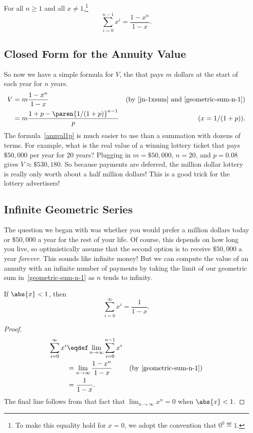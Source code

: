 \begin{theorem}
\label{th:seq}
For all $n \geq 1$ and all $x \neq 1$,\footnote{To make this equality
  hold for $x=0$, we adopt the convention that $0^0 \eqdef 1$.}
\[
\sum_{i=0}^{n-1} x^i = \frac{1- x^n}{1 - x}.
\]
\end{theorem}

\fi
\subsection{Closed Form for the Annuity Value}
So now we have a simple formula for $V$, the  that pays $m$ dollars at the start of each year for $n$ years.
\begin{align}
  V & = m \frac{1 - x^n}{1-x}
      & \text{(by~\eqref{jn-1xsum} and~\eqref{geometric-sum-n-1})}\label{Vmfrac1x}\\
  & = m \frac{1 + p - \paren{1/(1+p)}^{n-1}}{p}
      & (x = 1/(1+p)).\label{annval1p}
\end{align}
The formula~\eqref{annval1p} is much easier to use than a summation with
dozens of terms.  For example, what is the real value of a winning lottery
ticket that pays $\$50,000$ per year for 20 years?  Plugging in $m =
\$50,000$, $n = 20$, and $p = 0.08$ gives $V \approx \$530,180$.  So
because payments are deferred, the million dollar lottery is really only
worth about a half million dollars!  This is a good trick for the lottery
advertisers!

\subsection{Infinite Geometric Series}

The question we began with was whether you would prefer a million dollars
today or $\$50,000$ a year for the rest of your life.  Of course, this
depends on how long you live, so optimistically assume that the second
option is to receive $\$50,000$ a year \emph{forever}.  This sounds like
infinite money!  But we can compute the value of an annuity with an
infinite number of payments by taking the limit of our geometric sum
in~\eqref{geometric-sum-n-1} as $n$ tends to infinity.
\begin{theorem}\label{th:series}
If $\abs{x} < 1$, then
\[
\sum_{i=0}^\infty x^i = \frac{1}{1-x}.
\]
\end{theorem}

\begin{proof}
\begin{align*}
\sum_{i=0}^\infty x^i
   & \eqdef  \lim_{n \rightarrow \infty} \sum_{i=0}^{n-1} x^i \\
   & = \lim_{n \rightarrow \infty} \frac{1 - x^n}{1-x} & \text{(by~\eqref{geometric-sum-n-1})}\\
   & = \frac{1}{1-x}.  
\end{align*}
The final line follows from that fact that $\lim_{n \rightarrow \infty}
x^n =0$ when $\abs{x} < 1$.
\end{proof}

